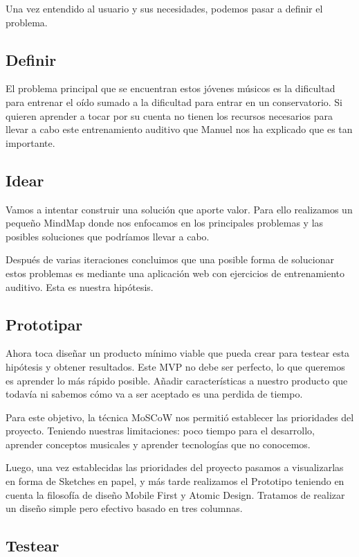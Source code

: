 \documentclass[12pt,twoside,titlepage]{report}
\begin{document}
{Una vez entendido al usuario y sus necesidades, podemos pasar a definir el problema.

\subsection{Definir}

El problema principal que se encuentran estos jóvenes músicos es la dificultad para entrenar el oído sumado a la dificultad para entrar en un conservatorio. Si quieren aprender a tocar por su cuenta no tienen los recursos necesarios para llevar a cabo este entrenamiento auditivo que Manuel nos ha explicado que es tan importante.

\subsection{Idear}

Vamos a intentar construir una solución que aporte valor. Para ello realizamos un pequeño MindMap donde nos enfocamos en los principales problemas y las posibles soluciones que podríamos llevar a cabo.

Después de varias iteraciones concluimos que una posible forma de solucionar estos problemas es mediante una aplicación web con ejercicios de entrenamiento auditivo. Esta es nuestra hipótesis.

\subsection{Prototipar}

Ahora toca diseñar un producto mínimo viable que pueda crear para testear esta hipótesis y obtener resultados. Este MVP no debe ser perfecto, lo que queremos es aprender lo más rápido posible. Añadir características a nuestro producto que todavía ni sabemos cómo va a ser aceptado es una perdida de tiempo. 

Para este objetivo, la técnica MoSCoW nos permitió establecer las prioridades del proyecto. Teniendo nuestras limitaciones: poco tiempo para el desarrollo, aprender conceptos musicales y aprender tecnologías que no conocemos.

Luego, una vez establecidas las prioridades del proyecto pasamos a visualizarlas en forma de Sketches en papel, y más tarde realizamos el Prototipo teniendo en cuenta la filosofía de diseño Mobile First y Atomic Design. Tratamos de realizar un diseño simple pero efectivo basado en tres columnas.

\subsection{Testear}

}
\end{document}
